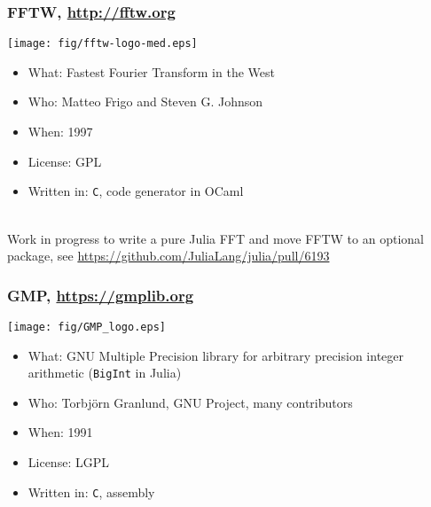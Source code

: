 \documentclass[compressed,dvips,letter]{beamer}
\begin{document}
%
%

\begin{frame}\frametitle{FFTW, \url{http://fftw.org}}

\vspace{-5pt}
\begin{center}
\texttt{[image: fig/fftw-logo-med.eps]}
\end{center}
\vspace{-15pt}
\begin{itemize}
\item What: Fastest Fourier Transform in the West
\item Who: Matteo Frigo and Steven G. Johnson
\item When: 1997
\item License: GPL
\item Written in: \texttt{C}, code generator in OCaml
\end{itemize}

~\\
Work in progress to write a pure Julia FFT and move FFTW to an optional package, see \url{https://github.com/JuliaLang/julia/pull/6193}
\end{frame}

%
%

\begin{frame}\frametitle{GMP, \url{https://gmplib.org}}

\begin{center}
\texttt{[image: fig/GMP\_logo.eps]}
\end{center}
\begin{itemize}
\item What: GNU Multiple Precision library for arbitrary precision integer arithmetic (\texttt{BigInt} in Julia)
\item Who: Torbj\"{o}rn Granlund, GNU Project, many contributors
\item When: 1991
\item License: LGPL
\item Written in: \texttt{C}, assembly
\end{itemize}

\end{frame}

%
%
\end{document}
